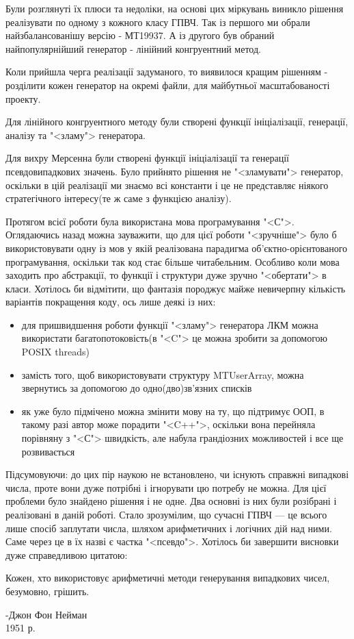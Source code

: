 \documentclass[oneside,final,14pt]{extreport}
\begin{document}
\begin{large}
 Були розглянуті їх плюси та недоліки, на основі цих міркувань виникло рішення 
	реалізувати по одному з кожного класу ГПВЧ. Так із першого ми обрали найзбалансованішу 
	версію - МТ19937. А із другого був обраний найпопулярнійший генератор - лінійний конгруентний метод.
	
	Коли прийшла черга реалізації задуманого, то виявилося кращим рішенням - розділити
	 кожен генератор на окремі файли, для майбутньої масштабованості проекту.
	
	Для лінійного конгруентного методу були створені функції ініціалізації, генерації, 
	аналізу та "<зламу"> генератора.
	
	Для вихру Мерсенна були створені функції ініціалізації та генерації псевдовипадкових 
	значень. Було прийнято рішення не "<зламувати"> генератор, оскільки в цій реалізації ми знаємо 
	всі константи і це не представляє ніякого стратегічного інтересу(те ж саме з функцією аналізу).

	Протягом всієї роботи була використана мова програмування "<С">. Оглядаючись назад можна 
зауважити, що для цієї роботи "<зручніше"> було б використовувати одну із мов у якій реалізована
парадигма об'єктно-орієнтованого програмування, оскільки так код стає більше читабельним. 
Особливо коли мова заходить про абстракції, то функції і структури дуже зручно "<обертати"> в класи.
Хотілось би відмітити, що фантазія породжує майже невичерпну кількість варіантів покращення 
коду, ось лише деякі із них:
\begin{itemize}
	\item 
для пришвидшення роботи функції "<зламу"> генератора ЛКМ можна використати 
багатопотоковість(в "<C"> це можна зробити за допомогою POSIX threads) 
\item 
замість того, щоб використовувати структуру MTUserArray, можна звернутись 
за допомогою до одно(дво)зв'язних списків
\item 
як уже було підмічено можна змінити мову на ту, що підтримує ООП, в такому разі автор 
може порадити "<C++">, оскільки вона перейняла порівняну з "<С"> швидкість, але набула грандіозних
 можливостей і все ще розвивається
\end{itemize}

	Підсумовуючи: до цих пір наукою не встановлено, чи існують справжні випадкові числа, проте вони 
дуже потрібні і ігнорувати цю потребу не можна. Для цієї проблеми було знайдено рішення і не одне. 
Два основні із них були розібрані і реалізовані в даній роботі. Стало зрозумілим, що сучасні ГПВЧ --- 
це всього лише спосіб заплутати числа, шляхом арифметичних і логічних дій над ними. Саме через це в 
їх назві є частка "<псевдо">. Хотілось би завершити висновки дуже справедливою цитатою:
\begin{displayquote}
Кожен, хто використовує арифметичні методи генерування 
випадкових чисел, безумовно, грішить.\\
\begin{flushright}
-Джон Фон Нейман\\1951 р.
\end{flushright}
\end{displayquote}


\end{large}
\end{document}
